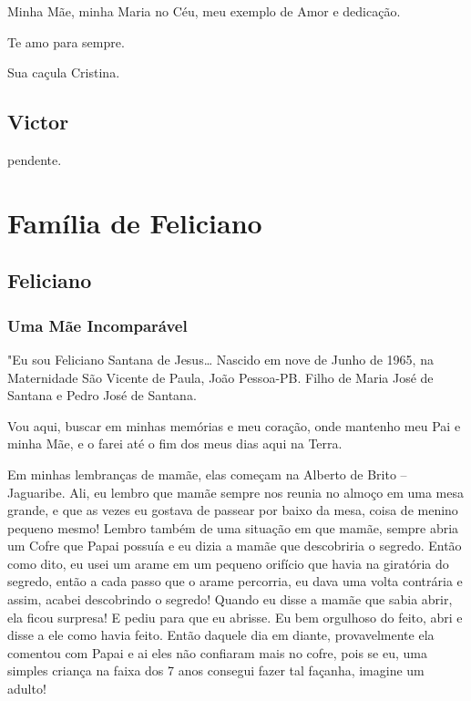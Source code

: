 \documentclass[
  brazil,
  a6paper,
  oneside,
  landscape,
  14pt]{scrbook}
\begin{document}
Minha Mãe, minha Maria no Céu, meu exemplo de Amor e dedicação.

Te amo para sempre.

Sua caçula Cristina.

\hypertarget{victor}{%
\section{Victor}\label{victor}}

pendente.

\hypertarget{famuxedlia-de-feliciano}{%
\chapter{Família de Feliciano}\label{famuxedlia-de-feliciano}}

\hypertarget{feliciano}{%
\section{Feliciano}\label{feliciano}}

\hypertarget{uma-muxe3e-incomparuxe1vel}{%
\subsection{Uma Mãe Incomparável}\label{uma-muxe3e-incomparuxe1vel}}

"Eu sou Feliciano Santana de Jesus\ldots{} Nascido em nove de Junho de
1965, na Maternidade São Vicente de Paula, João Pessoa-PB. Filho de
Maria José de Santana e Pedro José de Santana.

Vou aqui, buscar em minhas memórias e meu coração, onde mantenho meu Pai
e minha Mãe, e o farei até o fim dos meus dias aqui na Terra.

Em minhas lembranças de mamãe, elas começam na Alberto de Brito --
Jaguaribe. Ali, eu lembro que mamãe sempre nos reunia no almoço em uma
mesa grande, e que as vezes eu gostava de passear por baixo da mesa,
coisa de menino pequeno mesmo! Lembro também de uma situação em que
mamãe, sempre abria um Cofre que Papai possuía e eu dizia a mamãe que
descobriria o segredo. Então como dito, eu usei um arame em um pequeno
orifício que havia na giratória do segredo, então a cada passo que o
arame percorria, eu dava uma volta contrária e assim, acabei descobrindo
o segredo! Quando eu disse a mamãe que sabia abrir, ela ficou surpresa!
E pediu para que eu abrisse. Eu bem orgulhoso do feito, abri e disse a
ele como havia feito. Então daquele dia em diante, provavelmente ela
comentou com Papai e ai eles não confiaram mais no cofre, pois se eu,
uma simples criança na faixa dos 7 anos consegui fazer tal façanha,
imagine um adulto!
\end{document}
